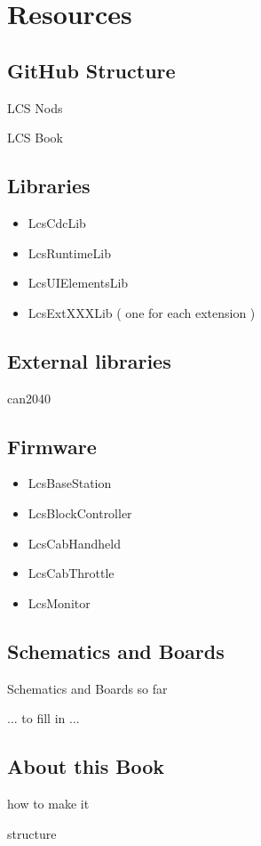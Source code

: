 \chapter{Resources}


\section{GitHub Structure}

LCS Nods

LCS Book

\section{Libraries}

\begin{itemize}
\item LcsCdcLib
\item LcsRuntimeLib
\item LcsUIElementsLib
\item LcsExtXXXLib ( one for each extension )
\end{itemize}

\section{External libraries}

can2040

\section{Firmware}

\begin{itemize}
\item LcsBaseStation
\item LcsBlockController
\item LcsCabHandheld
\item LcsCabThrottle
\item LcsMonitor
\end{itemize}

\section{Schematics and Boards}

Schematics and Boards so far

... to fill in ...

\section{About this Book}

how to make it 

structure
